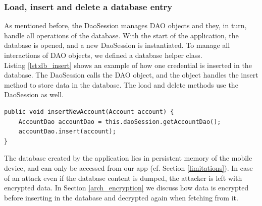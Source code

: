 \subsubsection*{Load, insert and delete a database entry}
As mentioned before, the DaoSession manages DAO objects and they, in turn, handle all operations of the database. With the start of the application, the database is opened, and a new DaoSession is instantiated. To manage all interactions of DAO objects, we defined a database helper class. \\
Listing \ref{lst:db_insert} shows an example of how one credential is inserted in the database. The DaoSession calls the DAO object, and the object handles the insert method to store data in the database. The load and delete methods use the DaoSession as well. 

\begin{lstlisting}[float,floatplacement=h, caption= Insert Entry in Database, label=lst:db_insert]
public void insertNewAccount(Account account) {
    AccountDao accountDao = this.daoSession.getAccountDao();
    accountDao.insert(account);
}
\end{lstlisting}
\vspace{0.5cm}

The database created by the application lies in persistent memory of the mobile device, and can only be accessed from our app (cf. Section \ref{limitations}). In case of an attack even if the database content is dumped, the attacker is left with encrypted data. In Section \ref{arch_encryption} we discuss how data is encrypted before inserting in the database and decrypted again when fetching from it. \\


